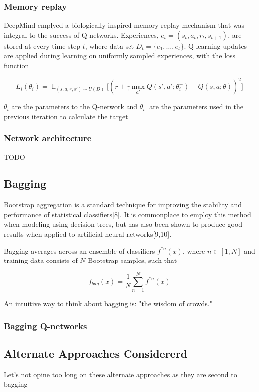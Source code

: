 \documentclass{article} %
\DeclareMathOperator{\E}{\mathbb{E}}
\begin{document}
\subsubsection*{Memory replay}
DeepMind emplyed a biologically-inspired memory replay mechanism that was integral
to the success of Q-networks. Experiences, $e_t = (s_t,a_t,r_t,s_{t+1})$, are stored 
at every time step $t$, where data set $ D_t = \{ e_{1}, \dots, e_{t} \} $. 
Q-learning updates are applied during learning on uniformly sampled experiences, 
with the loss function

\[
L_i(\theta_i) = \E_{(s,a,r,s') \sim U(D)} \bigg[ 
    \left( r + \gamma \max_{a'} Q(s',a';\theta^-_i) - Q(s,a;\theta)\right)^2 
\bigg]
\]

$\theta_i$ are the parameters to the Q-network and $\theta^-_i$ are the parameters used 
in the previous iteration to calculate the target.

\subsubsection*{Network architecture}
TODO

\subsection{Bagging}
Bootstrap aggregation is a standard technique for improving the stability
and performance of statistical classifiers[8].
It is commonplace to employ this method when modeling using decision trees, but has 
also been shown to produce good results when applied to artificial neural networks[9,10].

Bagging averages across an ensemble of classifiers $f^{*n}(x)$, where $n \in [1,N]$
and training data consists of $N$ Bootstrap samples, such that

\[
f_{bag}(x) = \frac{1}{N} \sum_{n=1}^{N} f^{*n}(x)
\]

An intuitive way to think about bagging is: "the wisdom of crowds."

\subsubsection*{Bagging Q-networks}

\subsection{Alternate Approaches Considererd}
Let's not opine too long on these alternate approaches as they are second to bagging
\end{document}
